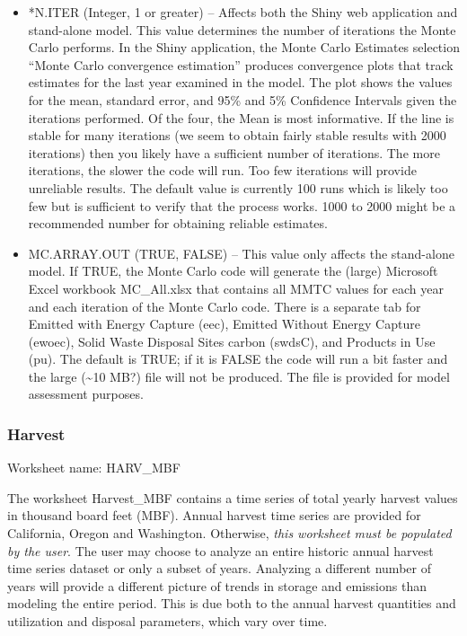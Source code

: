 \documentclass[
  openany]{book}
\begin{document}
\begin{itemize}
\item
  *N.ITER (Integer, 1 or greater) -- Affects both the Shiny web application and stand-alone model. This value determines the number of iterations the Monte Carlo performs. In the Shiny application, the Monte Carlo Estimates selection ``Monte Carlo convergence estimation'' produces convergence plots that track estimates for the last year examined in the model. The plot shows the values for the mean, standard error, and 95\% and 5\% Confidence Intervals given the iterations performed. Of the four, the Mean is most informative. If the line is stable for many iterations (we seem to obtain fairly stable results with 2000 iterations) then you likely have a sufficient number of iterations. The more iterations, the slower the code will run. Too few iterations will provide unreliable results. The default value is currently 100 runs which is likely too few but is sufficient to verify that the process works. 1000 to 2000 might be a recommended number for obtaining reliable estimates.
\item
  MC.ARRAY.OUT (TRUE, FALSE) -- This value only affects the stand-alone model. If TRUE, the Monte Carlo code will generate the (large) Microsoft Excel workbook MC\_All.xlsx that contains all MMTC values for each year and each iteration of the Monte Carlo code. There is a separate tab for Emitted with Energy Capture (eec), Emitted Without Energy Capture (ewoec), Solid Waste Disposal Sites carbon (swdsC), and Products in Use (pu). The default is TRUE; if it is FALSE the code will run a bit faster and the large (\textasciitilde10 MB?) file will not be produced. The file is provided for model assessment purposes.
\end{itemize}

\hypertarget{own-prov-input-harvest}{%
\subsubsection{Harvest}\label{own-prov-input-harvest}}

Worksheet name: HARV\_MBF

The worksheet Harvest\_MBF contains a time series of total yearly harvest values in thousand board feet (MBF). Annual harvest time series are provided for California, Oregon and Washington. Otherwise, \emph{this worksheet must be populated by the user}. The user may choose to analyze an entire historic annual harvest time series dataset or only a subset of years. Analyzing a different number of years will provide a different picture of trends in storage and emissions than modeling the entire period. This is due both to the annual harvest quantities and utilization and disposal parameters, which vary over time.
\end{document}
